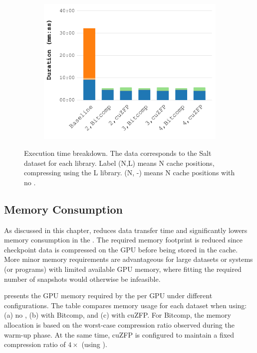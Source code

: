 \documentclass[Ingles,Final]{ic-tese-v3}
\begin{document}
\begin{figure}[h!]
    \begin{subfigure}{0.48\textwidth}
        \includegraphics[width=\textwidth]{figures/gpuzip_breakdown/Figure7_c.pdf}
        \caption{\uniform}
        \label{fig:breakdown_uniform}
    \end{subfigure}

    \caption[Execution time breakdown (\checkpointprefetching + \compression)]{Execution time breakdown. The data corresponds to the Salt dataset for each \checkpointing library. Label (N,L) means N cache positions, compressing using the L library. (N, -) means N cache positions with no \compression.}
    \label{fig:breakdown}
\end{figure}

\subsection{Memory Consumption}
\label{sec:comppref_mem}

As discussed in this chapter, \compression reduces data transfer time and significantly lowers memory consumption in the \cache. The required memory footprint is reduced since checkpoint data is compressed on the GPU before being stored in the cache. More minor memory requirements are advantageous for large datasets or systems (or programs) with limited available GPU memory, where fitting the required number of snapshots would otherwise be infeasible.

 presents the GPU memory required by the \cache per GPU under different configurations. The table compares memory usage for each dataset when using: (a) no \compression, (b) \compression with Bitcomp, and (c) \compression with cuZFP. For Bitcomp, the memory allocation is based on the worst-case compression ratio observed during the warm-up phase. At the same time, cuZFP is configured to maintain a fixed compression ratio of $4\times$ (using ).
\end{document}
